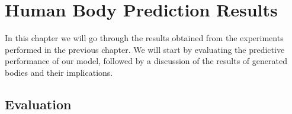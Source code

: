
\chapter{Human Body Prediction Results}\label{chap:results}

In this chapter we will go through the results obtained from the experiments
performed in the previous chapter. We will start by evaluating the predictive
performance of our model, followed by a discussion of the results of generated
bodies and their implications.

\section{Evaluation}

